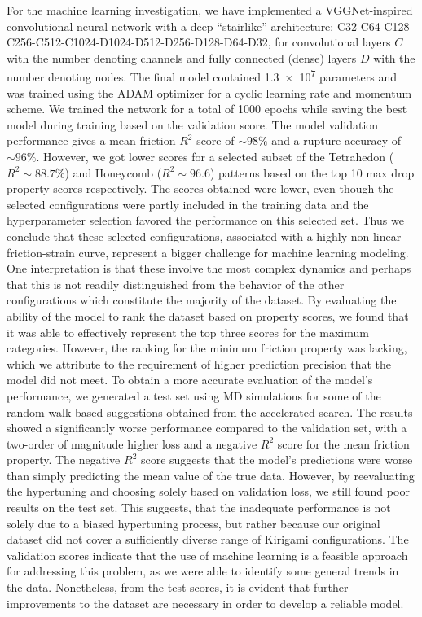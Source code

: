 For the machine learning investigation, we have implemented a VGGNet-inspired
convolutional neural network with a deep ``stairlike'' architecture:
C32-C64-C128-C256-C512-C1024-D1024-D512-D256-D128-D64-D32, for convolutional
layers $C$ with the number denoting channels and fully connected (dense) layers
$D$ with the number denoting nodes. The final model contained \num{1.3e7}
parameters and was trained using the ADAM optimizer for a cyclic learning rate
and momentum scheme. We trained the network for a total of 1000 epochs while
saving the best model during training based on the validation score. The model
validation performance gives a mean friction $R^2$ score of $\sim 98\%$ and a
rupture accuracy of $\sim 96 \%$. However, we got lower scores for a selected
subset of the Tetrahedon ($R^2 \sim 88.7 \%$) and Honeycomb ($R^2 \sim 96.6$)
patterns based on the top 10 max drop property scores respectively. The scores
obtained were lower, even though the selected configurations were partly
included in the training data and the hyperparameter selection favored the
performance on this selected set. Thus we conclude that these selected
configurations, associated with a highly non-linear friction-strain curve,
represent a bigger challenge for machine learning modeling. One interpretation
is that these involve the most complex dynamics and perhaps that this is not
readily distinguished from the behavior of the other configurations which
constitute the majority of the dataset. By evaluating the ability of the model
to rank the dataset based on property scores, we found that it was able to
effectively represent the top three scores for the maximum categories. However,
the ranking for the minimum friction property was lacking, which we attribute to
the requirement of higher prediction precision that the model did not meet. To
obtain a more accurate evaluation of the model's performance, we generated a
test set using \acrshort{MD} simulations for some of the random-walk-based
suggestions obtained from the accelerated search. The results showed a
significantly worse performance compared to the validation set, with a two-order
of magnitude higher loss and a negative $R^2$ score for the mean friction
property. The negative $R^2$ score suggests that the model's predictions were
worse than simply predicting the mean value of the true data. However, by
reevaluating the hypertuning and choosing solely based on validation loss, we
still found poor results on the test set. This suggests, that the inadequate
performance is not solely due to a biased hypertuning process,  but rather
because our original dataset did not cover a sufficiently diverse range of
Kirigami configurations. The validation scores indicate that the use of machine
learning is a feasible approach for addressing this problem, as we were able to
identify some general trends in the data. Nonetheless, from the test scores, it
is evident that further improvements to the dataset are necessary in order to
develop a reliable model.


